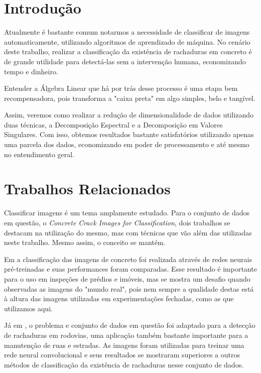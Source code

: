 \documentclass[a4paper, 12pt]{article}
\theoremstyle{definition}
\theoremstyle{remark}
\begin{document}
\newpage

\tableofcontents

\newpage

\section{Introdução}

Atualmente é bastante comum notarmos a necessidade de classificar de imagens automaticamente, utilizando algoritmos de aprendizado de máquina. No cenário deste trabalho, realizar a classificação da existência de rachaduras em concreto é de grande utilidade para detectá-las sem a intervenção humana, economizando tempo e dinheiro.

Entender a Álgebra Linear que há por trás desse processo é uma etapa bem recompensadora, pois transforma a "caixa preta" em algo simples, belo e tangível.

Assim, veremos como realizar a redução de dimensionalidade de dados utilizando duas técnicas, a Decomposição Espectral e a Decomposição em Valores Singulares. Com isso, obtemos resultados bastante satisfatórios utilizando apenas uma parcela dos dados, economizando em poder de processamento e até mesmo no entendimento geral.

\newpage
\section{Trabalhos Relacionados}

Classificar imagens é um tema amplamente estudado. Para o conjunto de dados em questão, o \textit{Concrete Crack Images for Classification}, dois trabalhos se destacam na utilização do mesmo, mas com técnicas que vão além das utilizadas neste trabalho. Mesmo assim, o conceito se mantém.

Em \cite{ozgenel2018} a classificação das imagens de concreto foi realizada através de redes neurais pré-treinadas e suas performances foram comparadas. Esse resultado é importante para o uso em inspeções de prédios e imóveis, mas se mostra um desafio quando observadas as imagens do "mundo real", pois nem sempre a qualidade destas está à altura das imagens utilizadas em experimentações fechadas, como as que utilizamos aqui.

Já em \cite{zhang2016}, o problema e conjunto de dados em questão foi adaptado para a detecção de rachaduras em rodovias, uma aplicação também bastante importante para a manutenção de ruas e estradas. As imagens foram utilizadas para treinar uma rede neural convolucional e seus resultados se mostraram superiores a outros métodos de classificação da existência de rachaduras nesse conjunto de dados.
\end{document}
